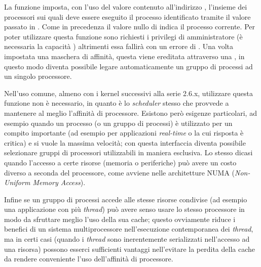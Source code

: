 La funzione imposta, con l'uso del valore contenuto all'indirizzo
, l'insieme dei processori sui quali deve essere eseguito il
processo identificato tramite il valore passato in . Come in
precedenza il valore nullo di  indica il processo corrente.  Per
poter utilizzare questa funzione sono richiesti i privilegi di amministratore
(è necessaria la capacità ) altrimenti essa fallirà con
un errore di . Una volta impostata una maschera di affinità,
questa viene ereditata attraverso una , in questo modo diventa
possibile legare automaticamente un gruppo di processi ad un singolo
processore.

Nell'uso comune, almeno con i kernel successivi alla serie 2.6.x, utilizzare
questa funzione non è necessario, in quanto è lo \textit{scheduler} stesso che
provvede a mantenere al meglio l'affinità di processore. Esistono però
esigenze particolari, ad esempio quando un processo (o un gruppo di processi)
è utilizzato per un compito importante (ad esempio per applicazioni
\textit{real-time} o la cui risposta è critica) e si vuole la massima
velocità; con questa interfaccia diventa possibile selezionare gruppi di
processori utilizzabili in maniera esclusiva.  Lo stesso dicasi quando
l'accesso a certe risorse (memoria o periferiche) può avere un costo diverso a
seconda del processore, come avviene nelle architetture NUMA
(\textit{Non-Uniform Memory Access}).

Infine se un gruppo di processi accede alle stesse risorse condivise (ad
esempio una applicazione con più \textit{thread}) può avere senso usare lo
stesso processore in modo da sfruttare meglio l'uso della sua cache; questo
ovviamente riduce i benefici di un sistema multiprocessore nell'esecuzione
contemporanea dei \textit{thread}, ma in certi casi (quando i \textit{thread}
sono inerentemente serializzati nell'accesso ad una risorsa) possono esserci
sufficienti vantaggi nell'evitare la perdita della cache da rendere
conveniente l'uso dell'affinità di processore.

